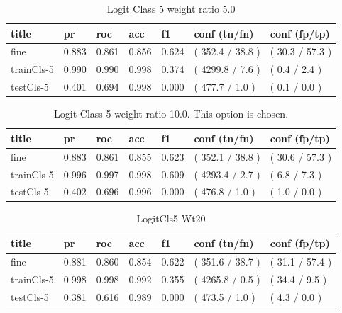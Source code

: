 \documentclass[ms]{nuthesis}
\begin{document}
\FloatBarrier
\begin{table}[H]
\centering
\caption{Logit Class 5 weight ratio 5.0}
\label{tab:LogRegCls5-Wt5}
\begin{tabular}{|l||l||l||l||l||l||l|}\toprule
title & pr & roc & acc & f1 & conf (tn/fn) & conf (fp/tp) \\ \midrule
fine & 0.883 & 0.861 & 0.856 & 0.624 & ( 352.4 / 38.8 ) & ( 30.3 / 57.3 ) \\
trainCls-5 & 0.990 & 0.990 & 0.998 & 0.374 & ( 4299.8 / 7.6 ) & ( 0.4 / 2.4 ) \\
testCls-5 & 0.401 & 0.694 & 0.998 & 0.000 & ( 477.7 / 1.0 ) & ( 0.1 / 0.0 ) \\ \bottomrule
\end{tabular}
\end{table}
\FloatBarrier

\FloatBarrier
\begin{table}[H]
\centering
\caption{Logit Class 5 weight ratio 10.0. This option is chosen.}
\label{tab:LogRegCls5-Wt10}
\begin{tabular}{|l||l||l||l||l||l||l|}\toprule
title & pr & roc & acc & f1 & conf (tn/fn) & conf (fp/tp) \\ \midrule
fine & 0.883 & 0.861 & 0.855 & 0.623 & ( 352.1 / 38.8 ) & ( 30.6 / 57.3 ) \\
trainCls-5 & 0.996 & 0.997 & 0.998 & 0.609 & ( 4293.4 / 2.7 ) & ( 6.8 / 7.3 ) \\
testCls-5 & 0.402 & 0.696 & 0.996 & 0.000 & ( 476.8 / 1.0 ) & ( 1.0 / 0.0 ) \\ \bottomrule
\end{tabular}
\end{table}
\FloatBarrier

\FloatBarrier
\begin{table}[H]
\centering
\caption{LogitCls5-Wt20}
\label{tab:LogRegCls5-Wt20}
\begin{tabular}{|l||l||l||l||l||l||l|}\toprule
title & pr & roc & acc & f1 & conf (tn/fn) & conf (fp/tp) \\ \midrule
fine & 0.881 & 0.860 & 0.854 & 0.622 & ( 351.6 / 38.7 ) & ( 31.1 / 57.4 ) \\
trainCls-5 & 0.998 & 0.998 & 0.992 & 0.355 & ( 4265.8 / 0.5 ) & ( 34.4 / 9.5 ) \\
testCls-5 & 0.381 & 0.616 & 0.989 & 0.000 & ( 473.5 / 1.0 ) & ( 4.3 / 0.0 ) \\ \bottomrule
\end{tabular}
\end{table}
\FloatBarrier
\end{document}

